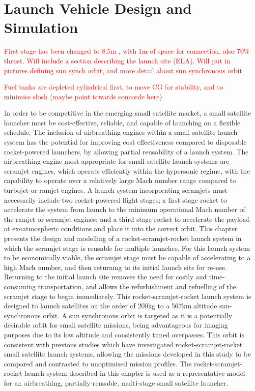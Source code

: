 
\cleardoublepage
\chapter{Launch Vehicle Design and Simulation}\label{chapter:Design}


\textcolor{red}{First stage has been changed to 8.5m , with 1m of space for connection, also 70\% thrust. Will include a section describing the launch site (ELA). Will put in pictures defining sun synch orbit, and more detail about sun synchronous orbit}

\textcolor{red}{Fuel tanks are depleted cylindrical first, to move CG for stability, and to minimise slosh (maybe point towards concorde here)}

In order to be competitive in the emerging small satellite market, a small satellite launcher must be cost-effective, reliable, and capable of launching on a flexible schedule. The inclusion of airbreathing engines within a small satellite launch system has the potential for improving cost effectiveness compared to disposable rocket-powered launchers, by allowing partial reusability of a launch system. The airbreathing engine most appropriate for small satellite launch systems are scramjet engines, which operate efficiently within the hypersonic regime, with the capability to operate over a relatively large Mach number range compared to turbojet or ramjet engines. A launch system incorporating scramjets must necessarily include two rocket-powered flight stages; a first stage rocket to accelerate the system from launch to the minimum operational Mach number of the ramjet or scramjet engines; and a third stage rocket to accelerate the payload at exoatmospheric conditions and place it into the correct orbit. 
This chapter presents the design and modelling of a rocket-scramjet-rocket launch system in which the scramjet stage is reusable for multiple launches. 
For this launch system to be economically viable, the scramjet stage must be capable of accelerating to a high Mach number, and then returning to its initial launch site for re-use. Returning to the initial launch site removes the need for costly and time-consuming transportation, and allows the refurbishment and refuelling of the scramjet stage to begin immediately. 
This rocket-scramjet-rocket launch system is designed to launch satellites on the order of 200kg to a 567km altitude sun-synchronous orbit. A sun synchronous orbit is targeted as it is a potentially desirable orbit for small satellite missions, being advantageous for imaging purposes due to its low altitude and consistently timed overpasses. This orbit is consistent with previous studies which have investigated rocket-scramjet-rocket small satellite launch systems, allowing the missions developed in this study to be compared and contrasted to unoptimised mission profiles. 
The rocket-scramjet-rocket launch system described in this chapter is used as a representative model for an airbreathing, partially-reusable, multi-stage small satellite launcher. 



